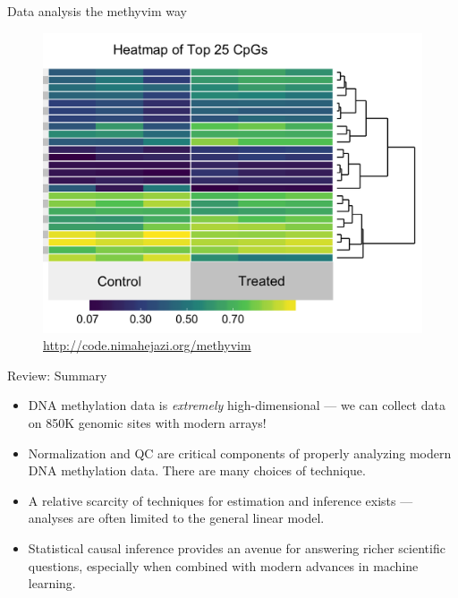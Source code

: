 \documentclass[12pt,t]{beamer}
\begin{document}
\begin{frame}[c]{Data analysis the methyvim way}

\begin{figure}[H]
  \centering
  \includegraphics[scale=0.25]{heatmap_methyvim}
  \caption{
    \url{http://code.nimahejazi.org/methyvim}
  }
\end{figure}

\note{
}

\end{frame}


\begin{frame}[c]{Review: Summary}

\begin{center}
\begin{itemize}
  \itemsep10pt
  \item DNA methylation data is \textit{extremely} high-dimensional --- we can
    collect data on 850K genomic sites with modern arrays!
  \item Normalization and QC are critical components of properly analyzing
    modern DNA methylation data. There are many choices of technique.
  \item A relative scarcity of techniques for estimation and inference exists
    --- analyses are often limited to the general linear model.
  \item Statistical causal inference provides an avenue for answering richer
    scientific questions, especially when combined with modern advances in
    machine learning.
\end{itemize}
\end{center}


\end{frame}
\end{document}
